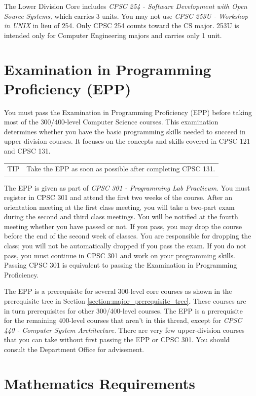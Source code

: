 \documentclass{book}
\newenvironment{tip}{
  \tcolorbox \begin{tabular}{m{.5in} m{5.25in}}
    \Large{TIP} &
}{
  \end{tabular} \endtcolorbox
}
\begin{document}
The Lower Division Core includes \emph{CPSC 254 - Software Development with Open Source Systems,} which carries 3 units. You may not use \emph{CPSC 253U - Workshop in UNIX} in lieu of 254. Only CPSC 254 counts toward the CS major. 253U is intended only for Computer Engineering majors and carries only 1 unit.

\section{Examination in Programming Proficiency (EPP)}
You must pass the Examination in Programming Proficiency (EPP) before taking most of the 300/400-level Computer Science courses. This examination determines whether you have the basic programming skills needed to succeed in upper division courses. It focuses on the concepts and skills covered in CPSC 121 and CPSC 131.

\begin{tip}
  Take the EPP as soon as possible after completing CPSC 131.
  \end{tip}

The EPP is given as part of \emph{CPSC 301 - Programming Lab Practicum.} You must register in CPSC 301 and attend the first two weeks of the course. After an orientation meeting at the first class meeting, you will take a two-part exam during the second and third class meetings. You will be notified at the fourth meeting whether you have passed or not. If you pass, you may drop the course before the end of the second week of classes. You are responsible for dropping the class; you will not be automatically dropped if you pass the exam. If you do not pass, you must continue in CPSC 301 and work on your programming skills. Passing CPSC 301 is equivalent to passing the Examination in Programming Proficiency.

The EPP is a prerequisite for several 300-level core courses as shown in the prerequisite tree in Section \ref{section:major_prerequisite_tree}. These courses are in turn prerequisites for other 300/400-level courses. The EPP is a prerequisite for the remaining 400-level courses that aren’t in this thread, except for \emph{CPSC 440 - Computer System Architecture.} There are very few upper-division courses that you can take without first passing the EPP or CPSC 301. You should consult the Department Office for advisement.

\section{Mathematics Requirements}
\end{document}
